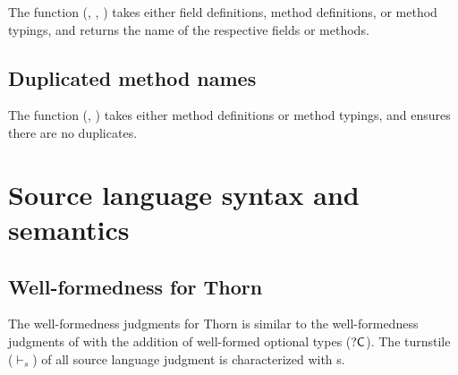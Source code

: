 \documentclass{tex/llncs}
\begin{document}
The  function (, , ) takes either field definitions, method definitions, or 
method typings, and returns the name of the respective fields or methods.

\subsection{Duplicated method names}

The  function (, ) takes either
method definitions or method typings, and ensures there are no duplicates.


\section{Source language syntax and semantics}

\subsection*{Well-formedness for Thorn}

The well-formedness judgments for Thorn is similar to the well-formedness
judgments of \kafka with the addition of well-formed optional types
(${\sf{?C}}$). The turnstile ($\vdash_{\!s}$) of all source language judgment is
characterized with s.
\end{document}
